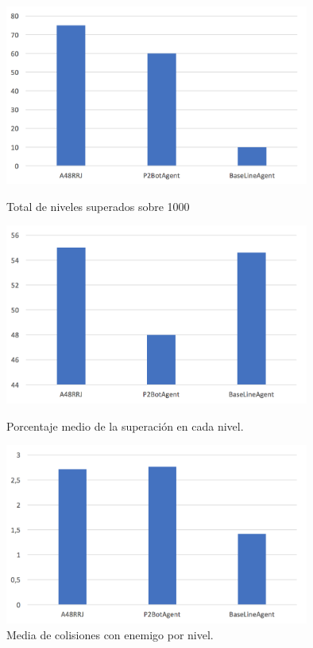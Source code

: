 \documentclass[10pt, spanish, pdftex]{../.template/template}
\begin{document}
    \begin{figure}[h!]
        \center
        \includegraphics[width=100mm]{nivsup}
        \caption{Total de niveles superados sobre 1000} %
        \label{nivsup}

        \center
        \includegraphics[width=100mm]{porcentaje}
        \caption{ Porcentaje medio de la superación en cada nivel.} %
        \label{porcentaje}

        \center
        \includegraphics[width=100mm]{nivel}
        \caption{ Media de colisiones con enemigo por nivel.} %
        \label{nivel}
    \end{figure}
\end{document}
